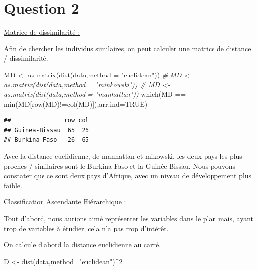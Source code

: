 \documentclass[
]{article}
\newenvironment{Shaded}{\begin{snugshade}}{\end{snugshade}}
\newcommand{\AttributeTok}[1]{\textcolor[rgb]{0.77,0.63,0.00}{#1}}
\newcommand{\CommentTok}[1]{\textcolor[rgb]{0.56,0.35,0.01}{\textit{#1}}}
\newcommand{\ConstantTok}[1]{\textcolor[rgb]{0.00,0.00,0.00}{#1}}
\newcommand{\DecValTok}[1]{\textcolor[rgb]{0.00,0.00,0.81}{#1}}
\newcommand{\FunctionTok}[1]{\textcolor[rgb]{0.00,0.00,0.00}{#1}}
\newcommand{\NormalTok}[1]{#1}
\newcommand{\OtherTok}[1]{\textcolor[rgb]{0.56,0.35,0.01}{#1}}
\newcommand{\SpecialCharTok}[1]{\textcolor[rgb]{0.00,0.00,0.00}{#1}}
\newcommand{\StringTok}[1]{\textcolor[rgb]{0.31,0.60,0.02}{#1}}
\begin{document}
\hypertarget{question-2}{%
\section{Question 2}\label{question-2}}

\uline{Matrice de dissimilarité :}

Afin de chercher les individus similaires, on peut calculer une matrice
de distance / dissimilarité.

\begin{Shaded}
\begin{Highlighting}[]
\NormalTok{MD }\OtherTok{\textless{}{-}} \FunctionTok{as.matrix}\NormalTok{(}\FunctionTok{dist}\NormalTok{(data,}\AttributeTok{method =} \StringTok{"euclidean"}\NormalTok{))}
\CommentTok{\# MD \textless{}{-} as.matrix(dist(data,method = "minkowski"))}
\CommentTok{\# MD \textless{}{-} as.matrix(dist(data,method = "manhattan"))}
\FunctionTok{which}\NormalTok{(MD }\SpecialCharTok{==} \FunctionTok{min}\NormalTok{(MD[}\FunctionTok{row}\NormalTok{(MD)}\SpecialCharTok{!=}\FunctionTok{col}\NormalTok{(MD)]),}\AttributeTok{arr.ind=}\ConstantTok{TRUE}\NormalTok{)}
\end{Highlighting}
\end{Shaded}

\begin{verbatim}
##               row col
## Guinea-Bissau  65  26
## Burkina Faso   26  65
\end{verbatim}

Avec la distance euclidienne, de manhattan et mikowski, les deux pays
les plus proches / similaires sont le Burkina Faso et la Guinée-Bissau.
Nous pouvons constater que ce sont deux pays d'Afrique, avec un niveau
de développement plus faible.

\uline{Classification Ascendante Hiérarchique :}

Tout d'abord, nous aurions aimé représenter les variables dans le plan
mais, ayant trop de variables à étudier, cela n'a pas trop d'intérêt.

On calcule d'abord la distance euclidienne au carré.

\begin{Shaded}
\begin{Highlighting}[]
\NormalTok{D }\OtherTok{\textless{}{-}} \FunctionTok{dist}\NormalTok{(data,}\AttributeTok{method=}\StringTok{"euclidean"}\NormalTok{)}\SpecialCharTok{\^{}}\DecValTok{2}
\end{Highlighting}
\end{Shaded}
\end{document}
